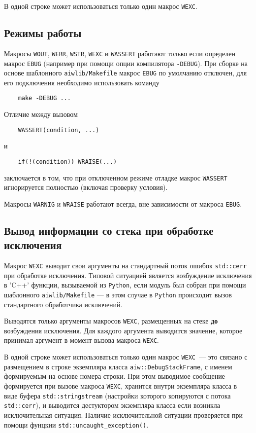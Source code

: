 В одной строке может использоваться только один макрос \verb'WEXC'.

\subsection{Режимы работы}
Макросы \verb'WOUT', \verb'WERR', \verb'WSTR', \verb'WEXC' и \verb'WASSERT' работают только если определен макрос \verb'EBUG'
(например при помощи опции компилятора \verb'-DEBUG'). При сборке на основе шаблонного \verb'aiwlib/Makefile'
макрос \verb'EBUG' по умолчанию отключен, для его подключения необходимо использовать команду
\begin{verbatim}
    make -DEBUG ...
\end{verbatim}

Отличие между вызовом 
\begin{verbatim}
    WASSERT(condition, ...)
\end{verbatim}
и
\begin{verbatim}
    if(!(condition)) WRAISE(...)
\end{verbatim}
заключается в том, что при отключенном режиме отладке макрос \verb'WASSERT' игнорируется полностью (включая проверку условия).

Макросы \verb'WARNIG' и \verb'WRAISE' работают всегда, вне зависимости от макроса \verb'EBUG'.

\subsection{Вывод информации со стека при обработке исключения}
Макрос \verb'WEXC' выводит свои аргументы на стандартный поток ошибок \verb'std::cerr' при обработке исключения.
Типовой ситуацией является возбуждение исключения в \veb'C++' функции, вызываемой из \verb'Python', если
модуль был собран при помощи шаблонного \verb'aiwlib/Makefile' --- в этом случае в \verb'Python' происходит
вызов стандартного обработчика исключений.

Выводятся только аргументы макросов \verb'WEXC', размещенных на стеке {\bf до} возбуждения исключения.
Для каждого аргумента выводится значение, которое принимал аргумент в момент вызова макроса \verb'WEXC'.

В одной строке может использоваться только один макрос \verb'WEXC'~--- это связано с размещением в строке
экземпляра класса \verb'aiw::DebugStackFrame', с именем формируемым на основе номера строки.
При этом выводимое сообщение формируется при вызове макроса \verb'WEXC', хранится внутри экземпляра класса в виде
буфера \verb'std::stringstream' (настройки которого копируются с потока \verb'std::cerr'),
и выводится дестуктором экземпляра класса если возникла исключительная ситуация.
Наличие исключительной ситуации проверяется при помощи фунцкии \verb'std::uncaught_exception()'.

